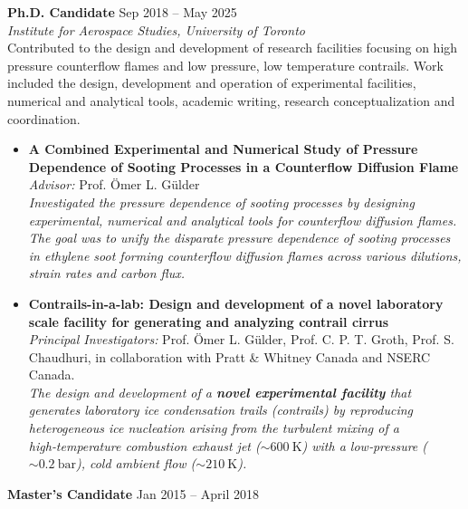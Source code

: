 \documentclass[11pt,a4paper]{article}
\begin{document}
	\vspace*{6pt}
	\noindent\textbf{Ph.D. Candidate} \hfill {Sep 2018 -- May 2025} \\
	\emph{Institute for Aerospace Studies, University of Toronto} \\
	Contributed to the design and development of research facilities focusing on high pressure counterflow flames and low pressure, low temperature contrails. Work included the design, development and operation of experimental facilities, numerical and analytical tools, academic writing, research conceptualization and coordination.\vspace*{6pt}
	\begin{itemize}[label=$\bullet$]
		\item {\bf A Combined Experimental and Numerical Study of Pressure Dependence of Sooting Processes in a Counterflow Diffusion Flame}\\   
		{{\it Advisor:} Prof. \"{O}mer L. G\"{u}lder}\vspace*{6pt}\\
		\emph{Investigated the pressure dependence of sooting processes by designing experimental, numerical and analytical tools for counterflow diffusion flames. The goal was to unify the disparate pressure dependence of sooting processes in ethylene soot forming counterflow diffusion flames across various dilutions, strain rates and carbon flux.}\vspace*{6pt}
		\item {\bf Contrails-in-a-lab: Design and development of a novel laboratory scale facility for generating and analyzing contrail cirrus}\\
		{{\it Principal Investigators:} Prof. \"{O}mer L. G\"{u}lder, Prof. C. P. T. Groth, Prof. S. Chaudhuri, in collaboration with Pratt \& Whitney Canada and NSERC Canada.}\vspace*{6pt}\\
		\emph{The design and development of a \textbf{novel experimental facility} that generates laboratory ice condensation trails (contrails) by reproducing heterogeneous ice nucleation arising from the turbulent mixing of a high‑temperature combustion exhaust jet ($\sim 600~\mathrm{K}$) with a low‑pressure ($\sim 0.2~\mathrm{bar}$), cold ambient flow ($\sim 210~\mathrm{K}$).}
	\end{itemize}
	\vspace*{6pt}
	\noindent\textbf{Master's Candidate} \hfill {Jan 2015 -- April 2018} \\
\end{document}
